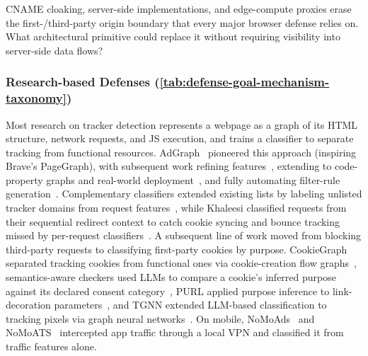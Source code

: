 \begin{opbox}
CNAME cloaking, server-side implementations, and edge-compute proxies erase the first-/third-party origin boundary that every major browser defense relies on. What architectural primitive could replace it without requiring visibility into server-side data flows?
\end{opbox}



\subsubsection{Research-based Defenses (\autoref{tab:defense-goal-mechanism-taxonomy})}
\label{sec:stateful-defenses-research}




%
Most research on tracker detection represents a webpage as a graph of its HTML structure, network requests, and JS execution, and trains a classifier to separate tracking from functional resources.
%
AdGraph~\cite{iqbalAdGraphGraphBasedApproach2020} pioneered this approach (inspiring Brave's PageGraph), with subsequent work refining features~\cite{sibyWebGraphCapturingAdvertising2022,yangWTAGRAPHWebTracking2022}, extending to code-property graphs and real-world deployment~\cite{leeAdCPGClassifyingJavaScript2023,leeAdFlushRealWorldDeployable2024}, and fully automating filter-rule generation~\cite{leAutoFRAutomatedFilter2023}.
%
Complementary classifiers extended existing lists by labeling unlisted tracker domains from request features~\cite{gugelmannAutomatedApproachComplementing2015,ikramSeamlessTrackingFreeWeb2017,reitingerMLCBMachineLearning2021}, while Khaleesi classified requests from their sequential redirect context to catch cookie syncing and bounce tracking missed by per-request classifiers~\cite{iqbalKhaleesiBreakerAdvertising2022}.
A subsequent line of work moved from blocking third-party requests to classifying first-party cookies by purpose.
%
CookieGraph separated tracking cookies from functional ones via cookie-creation flow graphs~\cite{munirCookieGraphUnderstandingDetecting2023}, semantics-aware checkers used LLMs to compare a cookie's inferred purpose against its declared consent category~\cite{chenSemanticsAwareCookiePurpose2025}, PURL applied purpose inference to link-decoration parameters~\cite{munirPURLSafeEffective2024}, and TGNN extended LLM-based classification to tracking pixels via graph neural networks~\cite{xiongTGNNEnhancingPixel2026}.
%
On mobile, NoMoAds~\cite{shubaNoMoAdsEffectiveEfficient2018} and NoMoATS~\cite{shubaNoMoATSAutomaticDetection2020} intercepted app traffic through a local VPN and classified it from traffic features alone.


